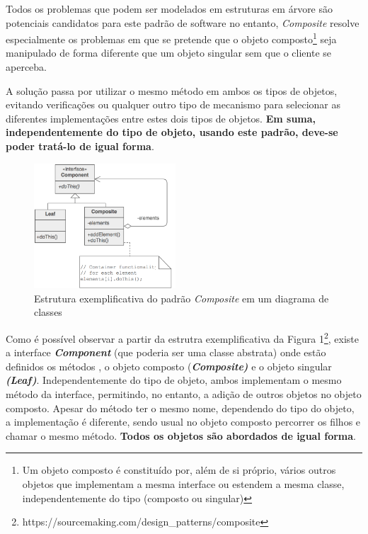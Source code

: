 \documentclass[10pt,portuguese]{article}
\begin{document}
\par Todos os problemas que podem ser modelados em estruturas em árvore são potenciais candidatos para este padrão de software no entanto, \textit{Composite} resolve especialmente os problemas em que se pretende que o objeto composto\footnote{Um objeto composto é constituído por, além de si próprio, vários outros objetos que implementam a mesma interface ou estendem a mesma classe, independentemente do tipo (composto ou singular)} seja manipulado de forma diferente que um objeto singular sem que o cliente se aperceba. 

\par A solução passa por utilizar o mesmo método em ambos os tipos de objetos, evitando verificações ou qualquer outro tipo de mecanismo para selecionar as diferentes implementações entre estes dois tipos de objetos. \textbf{Em suma, independentemente do tipo de objeto, usando este padrão, deve-se poder tratá-lo de igual forma}.

\begin{figure}[!h]
    \centering
    \includegraphics[width=200]{images/composite/UML.png}
    \caption{Estrutura exemplificativa do padrão \textit{Composite} em um diagrama de classes}
\end{figure}

\par Como é possível observar a partir da estrutra exemplificativa da Figura 1\footnote{https://sourcemaking.com/design\_patterns/composite}, existe a interface \textbf{\textit{Component}} (que poderia ser uma classe abstrata) onde estão definidos os métodos , o objeto composto (\textbf{\textit{Composite)}} e o objeto singular \textit{\textbf{(Leaf)}}. Independentemente do tipo de objeto, ambos implementam o mesmo método da interface, permitindo, no entanto,  a adição de outros objetos no objeto composto. Apesar do método ter o mesmo nome, dependendo do tipo do objeto, a implementação é diferente, sendo usual no objeto composto percorrer os filhos e chamar o mesmo método. \textbf{Todos os objetos são abordados de igual forma}.
\end{document}
